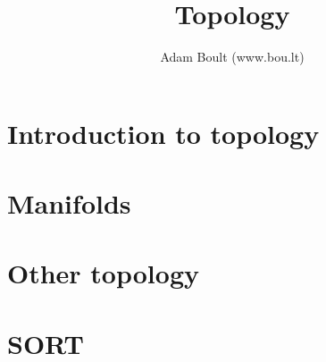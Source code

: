 \documentclass[oneside]{book}
\begin{document}
\author{Adam Boult (www.bou.lt)}
\title{Topology}
\maketitle

\setcounter{tocdepth}{0}
\tableofcontents



\part{Introduction to topology}

\part{Manifolds}






\part{Other topology}





\part{SORT}

\end{document}

